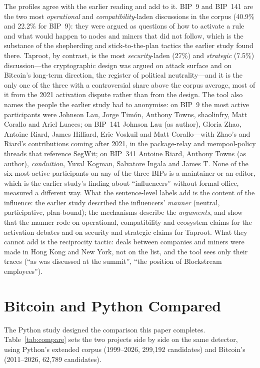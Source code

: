 \documentclass[sigconf,screen]{acmart}
\begin{document}
The profiles agree with the earlier reading and add to it. BIP~9 and BIP~141 are the two most \emph{operational} and \emph{compatibility}-laden discussions in the corpus (40.9\% and 22.2\% for BIP~9): they were argued as questions of how to activate a rule and what would happen to nodes and miners that did not follow, which is the substance of the shepherding and stick-to-the-plan tactics the earlier study found there. Taproot, by contrast, is the most \emph{security}-laden (27\%) and \emph{strategic} (7.5\%) discussion---the cryptographic design was argued on attack surface and on Bitcoin's long-term direction, the register of political neutrality---and it is the only one of the three with a controversial share above the corpus average, most of it from the 2021 activation dispute rather than from the design. The tool also names the people the earlier study had to anonymise: on BIP~9 the most active participants were Johnson Lau, Jorge Tim\'on, Anthony Towns, shaolinfry, Matt Corallo and Ariel Luaces; on BIP~141 Johnson Lau (as author), Gloria Zhao, Antoine Riard, James Hilliard, Eric Voskuil and Matt Corallo---with Zhao's and Riard's contributions coming after 2021, in the package-relay and mempool-policy threads that reference SegWit; on BIP~341 Antoine Riard, Anthony Towns (as author), \emph{conduition}, Yuval Kogman, Salvatore Ingala and James T. None of the six most active participants on any of the three BIPs is a maintainer or an editor, which is the earlier study's finding about ``influencers'' without formal office, measured a different way. What the sentence-level labels add is the content of the influence: the earlier study described the influencers' \emph{manner} (neutral, participative, plan-bound); the mechanisms describe the \emph{arguments}, and show that the manner rode on operational, compatibility and ecosystem claims for the activation debates and on security and strategic claims for Taproot. What they cannot add is the reciprocity tactic: deals between companies and miners were made in Hong Kong and New York, not on the list, and the tool sees only their traces (``as was discussed at the summit'', ``the position of Blockstream employees'').

\section{Bitcoin and Python Compared}
\label{sec:compare}

The Python study designed the comparison this paper completes. Table~\ref{tab:compare} sets the two projects side by side on the same detector, using Python's extended corpus (1999--2026, 299,192 candidates) and Bitcoin's (2011--2026, 62,789 candidates).
\end{document}
